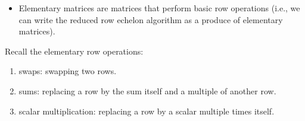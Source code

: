 \documentclass[
]{book}
\providecommand{\tightlist}{%
  \setlength{\itemsep}{0pt}\setlength{\parskip}{0pt}}
\theoremstyle{definition}
\theoremstyle{definition}
\theoremstyle{definition}
\theoremstyle{definition}
\theoremstyle{remark}
\begin{document}
\begin{itemize}
\tightlist
\item
  Elementary matrices are matrices that perform basic row operations (i.e., we can write the reduced row echelon algorithm as a produce of elementary matrices).
\end{itemize}

Recall the elementary row operations:

\begin{enumerate}
\def\labelenumi{\arabic{enumi})}
\tightlist
\item
  swaps: swapping two rows.
\item
  sums: replacing a row by the sum itself and a multiple of another row.
\item
  scalar multiplication: replacing a row by a scalar multiple times itself.
\end{enumerate}
\end{document}
